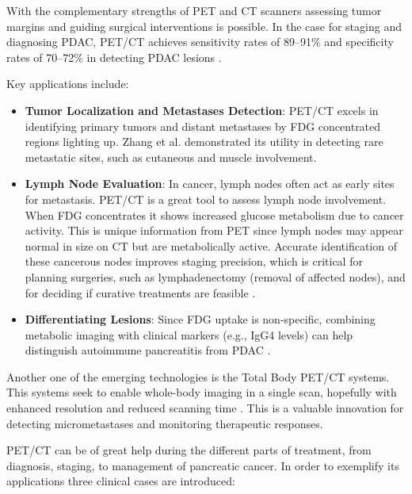 \begin{multicols}{2}

With the complementary strengths of PET and CT scanners assessing tumor margins and guiding surgical interventions is possible. In the case for staging and diagnosing PDAC, PET/CT achieves sensitivity rates of 89–91\% and specificity rates of 70–72\% in detecting PDAC lesions \cite{TG174}.

Key applications include:
\begin{itemize}
	\item \textbf{Tumor Localization and Metastases Detection}: PET/CT excels in identifying primary tumors and distant metastases by FDG concentrated regions lighting up. Zhang et al. demonstrated its utility in detecting rare metastatic sites, such as cutaneous and muscle involvement\cite{Zhang2023}.
	\item \textbf{Lymph Node Evaluation}: In cancer, lymph nodes often act as early sites for metastasis. PET/CT is a great tool to assess lymph node involvement. When FDG concentrates it shows increased glucose metabolism due to cancer activity. This is unique information from PET since lymph nodes may appear normal in size on CT but are metabolically active. Accurate identification of these cancerous nodes improves staging precision, which is critical for planning surgeries, such as lymphadenectomy (removal of affected nodes), and for deciding if curative treatments are feasible \cite{TG174}.
	\item \textbf{Differentiating Lesions}: Since FDG uptake is non-specific, combining metabolic imaging with clinical markers (e.g., IgG4 levels) can help distinguish autoimmune pancreatitis from PDAC \cite{Zheng2018}.
\end{itemize}

Another one of the emerging technologies is the Total Body PET/CT systems. This systems seek to enable whole-body imaging in a single scan, hopefully with enhanced resolution and reduced scanning time \cite{SunderlandSeminar}. This is a valuable innovation for detecting micrometastases and monitoring therapeutic responses. %


PET/CT can be of great help during the different parts of treatment, from diagnosis, staging, to management of pancreatic cancer. In order to exemplify its applications three clinical cases are introduced:


\end{multicols}
